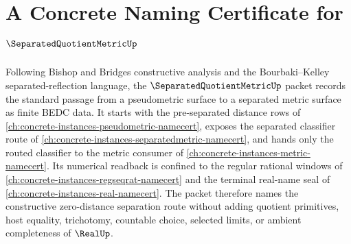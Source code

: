 \chapter{A Concrete Naming Certificate for $\SeparatedQuotientMetricUp$}
\label{ch:concrete-instances-separated-quotient-metric-namecert}

Following Bishop and Bridges constructive analysis and the Bourbaki--Kelley separated-reflection language, the $\SeparatedQuotientMetricUp$ packet records the standard passage from a pseudometric surface to a separated metric surface as finite BEDC data. It starts with the pre-separated distance rows of \autoref{ch:concrete-instances-pseudometric-namecert}, exposes the separated classifier route of \autoref{ch:concrete-instances-separatedmetric-namecert}, and hands only the routed classifier to the metric consumer of \autoref{ch:concrete-instances-metric-namecert}. Its numerical readback is confined to the regular rational windows of \autoref{ch:concrete-instances-regseqrat-namecert} and the terminal real-name seal of \autoref{ch:concrete-instances-real-namecert}. The packet therefore names the constructive zero-distance separation route without adding quotient primitives, host equality, trichotomy, countable choice, selected limits, or ambient completeness of $\RealUp$.

